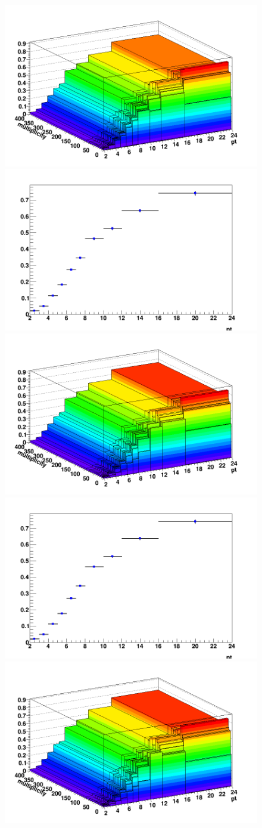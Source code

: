 \begin{figure}[h]   %
	\centering
	
	\includegraphics[width=.48\linewidth]{figuresVsCent/Dstar/EffAndFeed/EfficiencyMap_2D_DStar_c_020_ZNA_wLimAcc_Plot.png}
	\includegraphics[width=.48\linewidth]{figuresVsCent/Dstar/EffAndFeed/EfficiencyMap_1D_DStar_c_020_ZNA_wLimAcc_Plot.png}
	\includegraphics[width=.48\linewidth]{figuresVsCent/Dstar/EffAndFeed/EfficiencyMap_2D_DStar_c_2060_ZNA_wLimAcc_Plot.png}
	\includegraphics[width=.48\linewidth]{figuresVsCent/Dstar/EffAndFeed/EfficiencyMap_1D_DStar_c_2060_ZNA_wLimAcc_Plot.png}
	\includegraphics[width=.48\linewidth]{figuresVsCent/Dstar/EffAndFeed/EfficiencyMap_2D_DStar_c_60100_ZNA_wLimAcc_Plot.png}

\end{figure}
